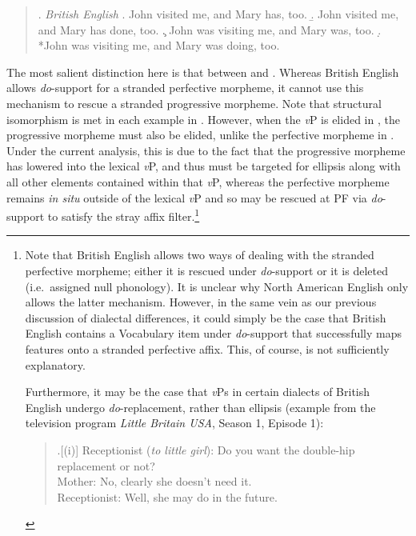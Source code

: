 \singlespacing
\begin{quote}
\ex. {\it British English}
\a. John visited me, and Mary has, too.
\b. John visited me, and Mary has done, too.
\c. John was visiting me, and Mary was, too.
\d. *John was visiting me, and Mary was doing, too. 

\end{quote}
\onehalfspacing
The most salient distinction here is that between \Last[b] and \Last[d]. Whereas British English allows {\it do}-support for a stranded perfective morpheme, it cannot use this mechanism to rescue a stranded progressive morpheme. Note that structural isomorphism is met in each example in \Last. However, when the {\it v}P is elided in \Last[d], the progressive morpheme must also be elided, unlike the perfective morpheme in \Last[b]. Under the current analysis, this is due to the fact that the progressive morpheme has lowered into the lexical {\it v}P, and thus must be targeted for ellipsis along with all other elements contained within that {\it v}P, whereas the perfective morpheme remains {\it in situ} outside of the lexical {\it v}P and so may be rescued at PF via {\it do}-support to satisfy the stray affix filter.\footnote{Note that British English allows two ways of dealing with the stranded perfective morpheme; either it is rescued under {\it do}-support or it is deleted (i.e.\ assigned null phonology). It is unclear why North American English only allows the latter mechanism. However, in the same vein as our previous discussion of dialectal differences, it could simply be the case that British English contains a Vocabulary item under {\it do}-support that successfully maps features onto a stranded perfective affix. This, of course, is not sufficiently explanatory.

Furthermore, it may be the case that {\it v}Ps in certain dialects of British English undergo {\it do}-replacement, rather than ellipsis (example from the television program {\it Little Britain USA}, Season 1, Episode 1):

\begin{quote}
\ex.[(i)] Receptionist ({\it to little girl}): Do you want the double-hip replacement or not?\\Mother: No, clearly she doesn't need it.\\Receptionist: Well, she may do in the future.


\end{quote}}
